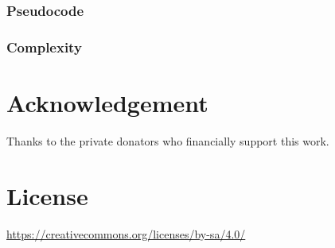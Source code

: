 \documentclass{article}
\newtheorem*{theorem A}{Theorem A}
\newtheorem*{theorem B}{N\"olker's Theorem}
\theoremstyle{remark}
\theoremstyle{remark}
\begin{document}
\subsubsection{Pseudocode}
\label{sss:pseudocode}
\subsubsection{Complexity}
\label{sss:complexity}
\section*{Acknowledgement}
\label{s:acknowledgement}
Thanks to the private donators who financially support this work.
\section*{License}
\label{s:license}
\begin{center}
	\url{https://creativecommons.org/licenses/by-sa/4.0/}
\end{center}
%
%
%

%
%
\end{document}
